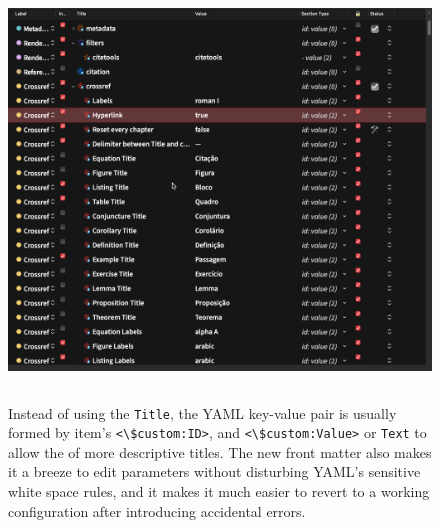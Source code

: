\documentclass[
  12pt,
  a4paper,
  oneside,
  titlepage,
  toclink=all,
  toc=bibliography]{scrbook}
\theoremstyle{definition}
\theoremstyle{plain}
\theoremstyle{plain}
\theoremstyle{plain}
\theoremstyle{plain}
\theoremstyle{definition}
\theoremstyle{definition}
\theoremstyle{plain}
\theoremstyle{remark}
\begin{document}
\begin{figure}

{\centering \includegraphics[width=5.20833in,height=4.36458in]{crossref.png}

}

\caption{\label{fig-scriv2A}Instead of using the \texttt{Title}, the
YAML key-value pair is usually formed by item's
\texttt{\textless{}\textbackslash{}\$custom:ID\textgreater{}}, and
\texttt{\textless{}\textbackslash{}\$custom:Value\textgreater{}} or
\texttt{Text} to allow the of more descriptive titles. The new front
matter also makes it a breeze to edit parameters without disturbing
YAML's sensitive white space rules, and it makes it much easier to
revert to a working configuration after introducing accidental errors.}

\end{figure}
\end{document}
